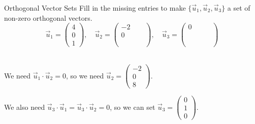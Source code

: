 \begin{frame}{Orthogonal Vector Sets}
     Fill in the missing entries to make $ \{\vec u_1 ,\vec u_2, \vec u_3\}$ a set of non-zero orthogonal vectors.
    \begin{equation*}
        \vec u_1 = \begin{pmatrix} 4 \\ 0 \\ 1 \end{pmatrix}, \quad 
        \vec u_2 = \begin{pmatrix}-2 \\ 0 \\    \phantom{-1 - 1 }\end{pmatrix}, \quad 
        \vec u_3 = \begin{pmatrix} 0 \\  \phantom{-1 - 1 } \\ \phantom{-1 - 1 }\end{pmatrix}
    \end{equation*}
    
    \\ \pause
    We need $\vec u_1\cdot \vec u_2 = 0$\pause, so we need $\vec u_2 = \begin{pmatrix} -2\\0 \\ 8 \end{pmatrix}$. 
    
    \pause 
    
    \vspace{12pt}
    
    We also need $\vec u_3\cdot \vec u_1 = \vec u_3 \cdot \vec u_2 = 0$, so we can set $\vec u_3 = \begin{pmatrix} 0 \\ 1 \\ 0 \end{pmatrix}$.

\end{frame}



